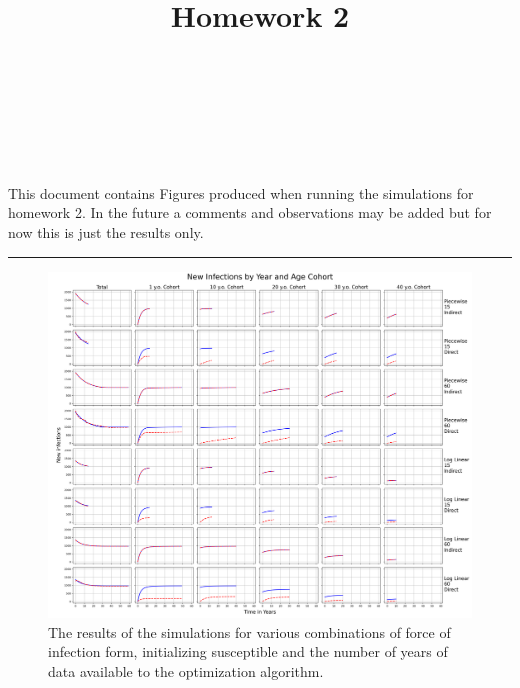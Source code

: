 \documentclass[10pt]{amsart}
\theoremstyle{nonumberplain}
\begin{document}
\pagestyle{empty}

\newcommand{\mline}{\vspace{.2in}\hrule\vspace{.2in}}

\noindent
{} \\
 \\
 \\
 \\

\title{\bf {Homework 2} }


\maketitle
\noindent
This document contains Figures produced when running the simulations for homework 2.
In the future a comments and observations may be added but for now this is just the results only.
\mline

\begin{figure}[h]
	\centering
	\includegraphics[width=1.15\textwidth]{new_infections_by_year_and_age_cohort.png}
 	\caption{The results of the simulations for various combinations of force of infection form, initializing susceptible and the number of years of data available to the optimization algorithm.}\label{fig:f1}
\end{figure}
\end{document}
